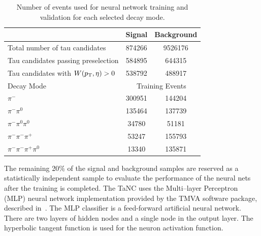 \begin{table}
   \centering
   \begin{tabular}{lcc}
                                                & Signal        & Background    \\
      \hline
      Total number of tau candidates           & 874266        & 9526176       \\
      Tau candidates passing preselection      & 584895        & 644315        \\
      Tau candidates with $W(p_{\mathrm{T}},\eta)>0$      & 538792        & 488917        \\
      \hline
      Decay Mode                        & \multicolumn{2}{c}{Training Events}   \\
      \hline
      $\pi^{-}$                         & 300951   & 144204                     \\
      $\pi^{-}\pi^0$                    & 135464   & 137739                     \\
      $\pi^{-}\pi^0\pi^0$               & 34780    & 51181                      \\
      $\pi^{-}\pi^{-}\pi^{+}$           & 53247    & 155793                     \\
      $\pi^{-}\pi^{-}\pi^{+}\pi^0$      & 13340    & 135871                     \\
   \end{tabular}
   \label{tab:trainingEvents} \caption[Neural network training event
   statistics]{Number of events used for neural network training and validation
   for each selected decay mode.}
\end{table}

The remaining 20\% of the signal and background samples are
reserved as a statistically independent sample to evaluate the performance of
the neural nets after the training is completed.  The TaNC uses the Multi--layer
Perceptron (MLP)
neural network implementation provided by the TMVA software package, described
in~\cite{TMVA}.  The MLP classifier is a feed-forward artificial neural
network. There are two layers of hidden nodes and a single node in the output
layer.  The hyperbolic tangent function is used for the neuron activation
function.  

